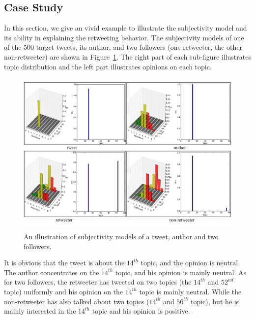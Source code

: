 \documentclass[letterpaper]{article}
\begin{document}
\subsection{Case Study}
\label{example}
In this section, we give an vivid example to illustrate the subjectivity model and its ability in explaining the retweeting behavior. 
The subjectivity models of one of the 500 target tweets, its author, and two followers (one retweeter, the other non-retweeter) are shown in Figure~\ref{fig5}. 
The right part of each sub-figure illustrates topic distribution and the left part illustrates opinions on each topic. 
\begin{figure}[htb]
\centering
\includegraphics[width=5.5in,height=3.2in]{fig5.pdf}
\caption{An illustration of subjectivity models of a tweet, author and two followers.}
\label{fig5}
\end{figure}


It is obvious that the tweet is about the $ 14^{th} $ topic, and the opinion is neutral.
The author concentrates on the $ 14^{th} $ topic, and his opinion is mainly neutral.
As for two followers, the retweeter has tweeted on two topics (the $ 14^{th} $ and $ 52^{nd} $ topic) uniformly 
and his opinion on the $ 14^{th} $ topic is mainly neutral.
While the non-retweeter has also talked about two topics ($ 14^{th} $ and $ 56^{th} $ topic), but he is mainly interested in the $ 14^{th} $ topic 
and his opinion is positive.
\end{document}
